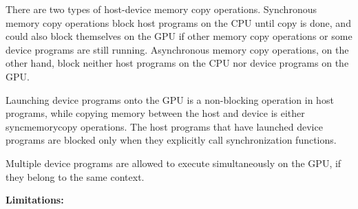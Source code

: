There are two types of host-device memory copy operations.
Synchronous memory copy operations block host programs on the CPU until
copy is done, and could also block themselves on the GPU if other memory
copy operations or some device programs are still running.
Asynchronous memory copy operations, on the other hand, block neither
host programs on the CPU nor device programs on the GPU.

Launching device programs onto the GPU is a non-blocking operation in
host programs, while copying memory between the host and device is
either syncmemorycopy operations.
The host programs that have launched device programs are blocked only
when they explicitly call synchronization functions.

Multiple device programs are allowed to execute simultaneously on the
GPU, if they belong to the same context.

\textbf{Limitations:}